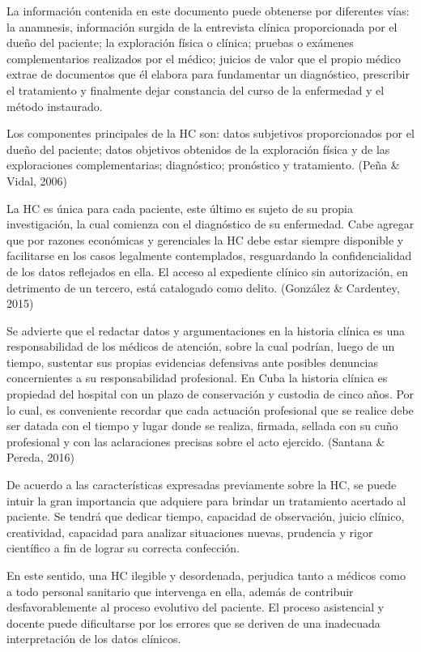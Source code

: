 La información contenida en este documento puede obtenerse por diferentes vías: la anamnesis, información surgida de la entrevista clínica proporcionada por el dueño del paciente; la exploración física o clínica; pruebas o exámenes complementarios realizados por el médico; juicios de valor que el propio médico extrae de documentos que él elabora para fundamentar un diagnóstico, prescribir el tratamiento y finalmente dejar constancia del curso de la enfermedad y el método instaurado.  

Los componentes principales de la HC son: datos subjetivos proporcionados por el dueño del paciente; datos objetivos obtenidos de la exploración física y de las exploraciones complementarias; diagnóstico; pronóstico y tratamiento. (Peña \& Vidal, 2006)   

La HC es única para cada paciente, este último es sujeto de su propia investigación, la cual comienza con el diagnóstico de su enfermedad. Cabe agregar que por razones económicas y gerenciales la HC debe estar siempre disponible y facilitarse en los casos legalmente contemplados, resguardando la confidencialidad de los datos reflejados en ella. El acceso al expediente clínico sin autorización, en detrimento de un tercero, está catalogado como delito. (González \& Cardentey, 2015) 

Se advierte que el redactar datos y argumentaciones en la historia clínica es una responsabilidad de los médicos de atención, sobre la cual podrían, luego de un tiempo, sustentar sus propias evidencias defensivas ante posibles denuncias concernientes a su responsabilidad profesional. En Cuba la historia clínica es propiedad del hospital con un plazo de conservación y custodia de cinco años. Por lo cual, es conveniente recordar que cada actuación profesional que se realice debe ser datada con el tiempo y lugar donde se realiza, firmada, sellada con su cuño profesional y con las aclaraciones precisas sobre el acto ejercido. (Santana \& Pereda, 2016)  

De acuerdo a las características expresadas previamente sobre la HC, se puede intuir la gran importancia que adquiere para brindar un tratamiento acertado al paciente. Se tendrá que dedicar tiempo, capacidad de observación, juicio clínico, creatividad, capacidad para analizar situaciones nuevas, prudencia y rigor científico a fin de lograr su correcta confección. 

En este sentido, una HC ilegible y desordenada, perjudica tanto a médicos como a todo personal sanitario que intervenga en ella, además de contribuir desfavorablemente al proceso evolutivo del paciente. El proceso asistencial y docente puede dificultarse por los errores que se deriven de una inadecuada interpretación de los datos clínicos.  

